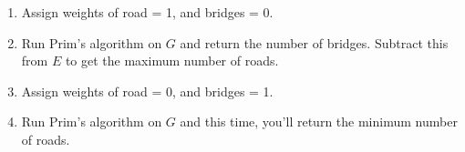 \documentclass[11pt]{article}
\begin{document}
 
 \begin{algo*}
 \begin{enumerate}
 \item Assign weights of road = 1, and bridges = 0.
 \item Run Prim's algorithm on $G$ and return the number of bridges. Subtract this from $E$ to get the maximum number of roads. 
 \item Assign weights of road = 0, and bridges = 1.
 \item Run Prim's algorithm on $G$ and this time, you'll return the minimum number of roads.
 \end{enumerate}
 \end{algo*}
\end{document}
